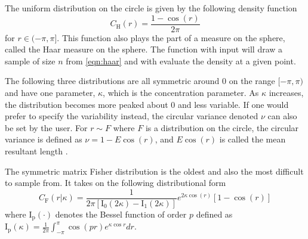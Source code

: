 
The uniform distribution on the circle is given by the following density function
\begin{equation}\label{eqn:haar}
C_\mathrm{{H}}(r)=\frac{1-\cos(r)}{2\pi}
\end{equation}
for $r\in(-\pi,\pi]$.  This function also plays the part of a measure on the sphere, called the Haar measure on the sphere.  The function  with input  will draw a sample of size $n$ from \eqref{eqn:haar} and  with evaluate the density at a given point.

The following three distributions are all symmetric around $0$ on the range $[-\pi,\pi)$ and have one parameter, $\kappa$, which is the concentration parameter.  As $\kappa$ increases, the distribution becomes more peaked about $0$ and less variable.  If one would prefer to specify the variability instead, the circular variance denoted $\nu$ can also be set by the user.  For $r\sim F$ where $F$ is a distribution on the circle, the circular variance is defined as $\nu=1-E\cos(r)$, and $E\cos(r)$ is called the mean resultant length \citep{mardia2000}.

The symmetric matrix Fisher distribution is the oldest and also the most difficult to sample from.  It takes on the following distributional form
\[
C_\mathrm{{F}}(r| 
\kappa)=\frac{1}{2\pi[\mathrm{I_0}(2\kappa)-\mathrm{I_1}(2\kappa)]}e^{2\kappa\cos(r)}[1-\cos(r)]
\]
where $\mathrm{I_p}(\cdot)$ denotes the Bessel function of order $p$ defined as  $\mathrm{I_p}(\kappa)=\frac{1}{2\pi}\int_{-\pi}^{\pi}\cos(pr)e^{\kappa\cos r}dr$.  

